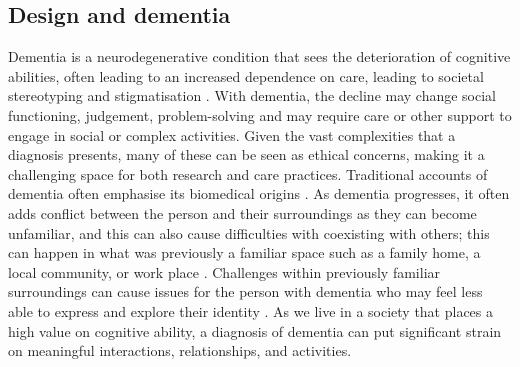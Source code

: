 \subsection{Design and dementia}
\label{Context:Design}




Dementia is a neurodegenerative condition that sees the deterioration of cognitive abilities, often leading to an increased dependence on care, leading to societal stereotyping and stigmatisation \citep{herrmann_systematic_2018}. With dementia, the decline may change social functioning, judgement, problem-solving and may require care or other support to engage in social or complex activities. Given the vast complexities that a diagnosis presents, many of these can be seen as ethical concerns, making it a challenging space for both research and care practices. Traditional accounts of dementia often emphasise its biomedical origins \citep{leibing_annette_thinking_2006}. As dementia progresses, it often adds conflict between the person and their surroundings as they can become unfamiliar, and this can also cause difficulties with coexisting with others; this can happen in what was previously a familiar space such as a family home, a local community, or work place \citep{langdon_making_2007}. Challenges within previously familiar surroundings can cause issues for the person with dementia who may feel less able to express and explore their identity \citep{john_killick_claire_craig_creativity_2012, kontos_embodied_2005}. As we live in a society that places a high value on cognitive ability, a diagnosis of dementia can put significant strain on meaningful interactions, relationships, and activities. 

